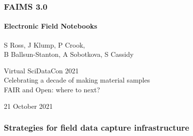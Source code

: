 \documentclass[
	aspectratio=169, %
	12pt, %
	t, %
]{beamer}
\begin{document}
\begin{refsegment}




\begin{titleframe} %
	\frametitle{FAIMS 3.0}
	\framesubtitle{Electronic Field Notebooks}

	S Ross, J Klump, P Crook, \\B Ballsun-Stanton, A Sobotkova, S Cassidy
    
    \medskip
    
    Virtual SciDataCon 2021\\
	Celebrating a decade of making material samples\\ FAIR and Open: where to next?
	
	\medskip
	
	21 October 2021
	
\end{titleframe}





\begin{frame}
    \frametitle{Strategies for field data capture infrastructure}
    

\end{frame}
\end{refsegment}
\end{document}
